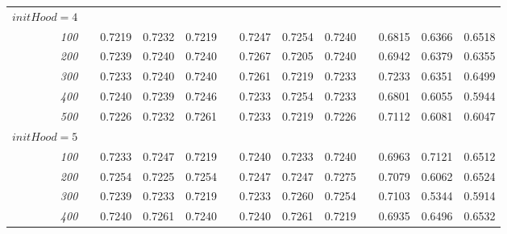 \documentclass[a4paper, 10pt]{article}
\begin{document}
\begin{figure}[h]
\begin{tabular}{@{}rcrrrcrrrcrrr@{}}
      $initHood = 4$ \\
      \emph{100}  &&  0.7219  &  0.7232  &  0.7219  &&  0.7247  &  0.7254  &  0.7240  &&  0.6815  &  0.6366  &  0.6518 \\
      \emph{200}  &&  0.7239  &  0.7240  &  0.7240  &&  0.7267  &  0.7205  &  0.7240  &&  0.6942  &  0.6379  &  0.6355 \\
      \emph{300}  &&  0.7233  &  0.7240  &  0.7240  &&  0.7261  &  0.7219  &  0.7233  &&  0.7233  &  0.6351  &  0.6499 \\
      \emph{400}  &&  0.7240  &  0.7239  &  0.7246  &&  0.7233  &  0.7254  &  0.7233  &&  0.6801  &  0.6055  &  0.5944 \\
      \emph{500}  &&  0.7226  &  0.7232  &  0.7261  &&  0.7233  &  0.7219  &  0.7226  &&  0.7112  &  0.6081  &  0.6047 \\
      $initHood = 5$ \\
      \emph{100}  &&  0.7233  &  0.7247  &  0.7219  &&  0.7240  &  0.7233  &  0.7240  &&  0.6963  &  0.7121  &  0.6512 \\
      \emph{200}  &&  0.7254  &  0.7225  &  0.7254  &&  0.7247  &  0.7247  &  0.7275  &&  0.7079  &  0.6062  &  0.6524 \\
      \emph{300}  &&  0.7239  &  0.7233  &  0.7219  &&  0.7233  &  0.7260  &  0.7254  &&  0.7103  &  0.5344  &  0.5914 \\
      \emph{400}  &&  0.7240  &  0.7261  &  0.7240  &&  0.7240  &  0.7261  &  0.7219  &&  0.6935  &  0.6496  &  0.6532 \\

\end{tabular}
\end{figure}
\end{document}
